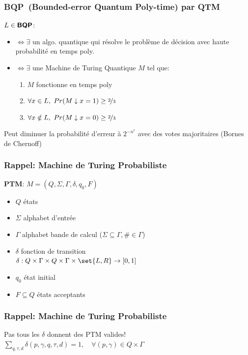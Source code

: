 \documentclass{beamer}
\newcommand{\bqp}{\textsf{\textbf{BQP}}}
\begin{document}
\begin{frame}
  \frametitle{\bqp \ (Bounded-error Quantum Poly-time) par QTM}

  $L \in \bqp$:
  \begin{itemize}
    \item $\iff \exists$ un algo. \alert{quantique} qui r\'esolve le probl\`eme de d\'ecision avec haute probabilit\'e en temps poly.
    \item $\iff \exists$ une Machine de Turing \alert{Quantique} $M$ tel que:
          \begin{enumerate}
            \item $M$ fonctionne en temps poly
            \item $\forall x \in L,\ Pr(M \downarrow x = 1) \geq \nicefrac{2}{3}$
            \item $\forall x \notin L,\ Pr(M \downarrow x = 0) \geq \nicefrac{2}{3}$
          \end{enumerate}
  \end{itemize}

  Peut diminuer la probabilit\'e d'erreur \`a $2^{-n^c}$ avec des votes majoritaires (Bornes de Chernoff)
\end{frame}

\begin{frame}
  \frametitle{Rappel: Machine de Turing Probabiliste}

  \textbf{PTM}: $M = (Q, \Sigma, \Gamma, \delta, q_0, F)$

  \begin{itemize}
    \item $Q$ \'etats
    \item $\Sigma$ alphabet d'entr\'ee
    \item $\Gamma$ alphabet bande de calcul ($\Sigma \subseteq \Gamma, \texttt{\#} \in \Gamma$)
    \item $\delta$ fonction de transition \\
          $\delta: Q \times \Gamma \times Q \times \Gamma \times \set{L, R} \rightarrow [0,1]$
    \item $q_0$ \'etat initial
    \item $F \subseteq Q$ \'etats acceptants
  \end{itemize}
\end{frame}

\begin{frame}
  \frametitle{Rappel: Machine de Turing Probabiliste}

  Pas tous les $\delta$ donnent des PTM valides!\\
  \pause
  $\sum_{q, \tau, d} \delta(p, \gamma, q, \tau, d) = 1, \quad \forall (p, \gamma) \in Q \times \Gamma$
\end{frame}
\end{document}
